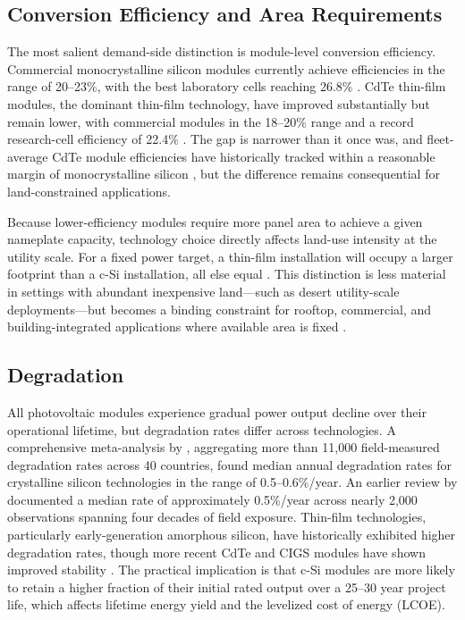\documentclass{article}
\begin{document}
\subsection{Conversion Efficiency and Area Requirements}
 
The most salient demand-side distinction is module-level conversion efficiency. Commercial monocrystalline silicon modules currently achieve efficiencies in the range of 20--23\%, with the best laboratory cells reaching 26.8\% \citep{Green2024}. CdTe thin-film modules, the dominant thin-film technology, have improved substantially but remain lower, with commercial modules in the 18--20\% range and a record research-cell efficiency of 22.4\% \citep{Green2024, NREL_CdTe2025}. The gap is narrower than it once was, and fleet-average CdTe module efficiencies have historically tracked within a reasonable margin of monocrystalline silicon \citep{NREL_CdTe2025}, but the difference remains consequential for land-constrained applications.
 
Because lower-efficiency modules require more panel area to achieve a given nameplate capacity, technology choice directly affects land-use intensity at the utility scale. For a fixed power target, a thin-film installation will occupy a larger footprint than a c-Si installation, all else equal \citep{Ong2013, Bolinger2022}. This distinction is less material in settings with abundant inexpensive land---such as desert utility-scale deployments---but becomes a binding constraint for rooftop, commercial, and building-integrated applications where available area is fixed \citep{EIA2018}.
 
\subsection{Degradation}
 
All photovoltaic modules experience gradual power output decline over their operational lifetime, but degradation rates differ across technologies. A comprehensive meta-analysis by \citet{Jordan2016}, aggregating more than 11{,}000 field-measured degradation rates across 40 countries, found median annual degradation rates for crystalline silicon technologies in the range of 0.5--0.6\%/year. An earlier review by \citet{Jordan2013} documented a median rate of approximately 0.5\%/year across nearly 2{,}000 observations spanning four decades of field exposure. Thin-film technologies, particularly early-generation amorphous silicon, have historically exhibited higher degradation rates, though more recent CdTe and CIGS modules have shown improved stability \citep{Jordan2016}. The practical implication is that c-Si modules are more likely to retain a higher fraction of their initial rated output over a 25--30 year project life, which affects lifetime energy yield and the levelized cost of energy (LCOE).
 
\end{document}
